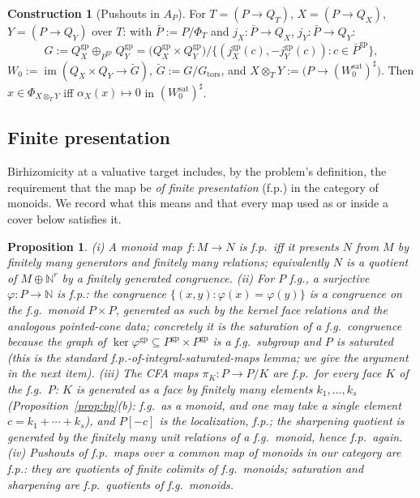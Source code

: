 \documentclass[11pt]{article}
\newtheorem{proposition}[theorem]{Proposition}
\theoremstyle{definition}
\newtheorem{construction}[theorem]{Construction}
\newcommand{\gp}{\mathrm{gp}}
\newcommand{\sat}{\mathrm{sat}}
\begin{document}
\begin{construction}[Pushouts in $A_P$]\label{constr:pushout}
For $T=(P\to Q_T)$, $X=(P\to Q_X)$, $Y=(P\to Q_Y)$ over $T$: with
$\bar P:=P/\Phi_T$ and $j_X:\bar P\to Q_X$, $j_Y:\bar P\to Q_Y$:
\[
G:=Q_X^{\gp}\oplus_{\bar P^{\gp}}Q_Y^{\gp}
=\bigl(Q_X^{\gp}\times Q_Y^{\gp}\bigr)\big/
\bigl\{(j_X^{\gp}(c),-j_Y^{\gp}(c)) : c\in\bar P^{\gp}\bigr\},
\]
$W_0:=\operatorname{im}(Q_X\times Q_Y\to\breve G)$,
$\breve G:=G/G_{\mathrm{tors}}$, and
$X\otimes_TY:=\bigl(P\to (W_0^{\sat})^{\sharp}\bigr)$. Then
$x\in\Phi_{X\otimes_TY}$ iff $\alpha_X(x)\mapsto0$ in
$(W_0^{\sat})^{\sharp}$.
\end{construction}

\subsection{Finite presentation}\label{ssec:fp}

Birhizomicity at a valuative target includes, by the problem's
definition, the requirement that the map be \emph{of finite
presentation} (f.p.) in the category of monoids. We record what
this means and that every map used as or inside a cover below
satisfies it.

\begin{proposition}\label{prop:fp}
\textup{(}i\textup{)} A monoid map $f:M\to N$ is f.p.\ iff it
presents $N$ from $M$ by finitely many generators and finitely
many relations; equivalently $N$ is a quotient of
$M\oplus\mathbb N^r$ by a finitely generated congruence.
\textup{(}ii\textup{)} For $P$ f.g., a surjective $\varphi:P\to
\mathbb N$ is f.p.: the congruence
$\{(x,y):\varphi(x)=\varphi(y)\}$ is a congruence on the f.g.\
monoid $P\times P$, generated as such by the kernel face
relations and the analogous pointed-cone data; concretely it is
the saturation of a f.g.\ congruence because the graph of
$\ker\varphi^{\gp}\subseteq P^{\gp}\times P^{\gp}$ is a f.g.\
 subgroup and $P$ is saturated \textup{(}this is the standard
f.p.-of-integral-saturated-maps lemma; we give the argument in
the next item\textup{)}.
\textup{(}iii\textup{)} The CFA maps $\pi_K:P\to P/K$ are f.p.\
for every face $K$ of the f.g.\ $P$: $K$ is generated as a face
by finitely many elements $k_1,\dots,k_s$
\textup{(}Proposition~\ref{prop:bp}\textup{(}b\textup{):} f.g.\
as a monoid, and one may take a single element
$c=k_1+\cdots+k_s$\textup{)}, and $P[-c]$ is the localization,
f.p.; the sharpening quotient is generated by the finitely many
unit relations of a f.g.\ monoid, hence f.p.\ again.
\textup{(}iv\textup{)} Pushouts of f.p.\ maps over a common map
of monoids in our category are f.p.: they are quotients of
finite colimits of f.g.\ monoids; saturation and sharpening are
f.p.\ quotients of f.g.\ monoids.
\end{proposition}
\end{document}
